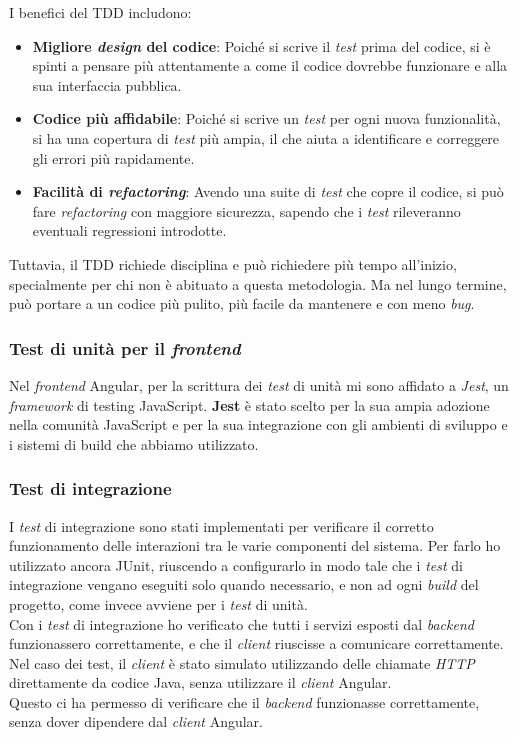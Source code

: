 I benefici del TDD includono:
\begin{itemize}
  \item \textbf{Migliore \textit{design} del codice}: Poiché si scrive il \textit{test} prima del codice, si è spinti a pensare più attentamente a come il codice dovrebbe funzionare e alla sua interfaccia pubblica.
  \item \textbf{Codice più affidabile}: Poiché si scrive un \textit{test} per ogni nuova funzionalità, si ha una copertura di \textit{test} più ampia, il che aiuta a identificare e correggere gli errori più rapidamente.
  \item \textbf{Facilità di \textit{refactoring}}: Avendo una suite di \textit{test} che copre il codice, si può fare \textit{refactoring} con maggiore sicurezza, sapendo che i \textit{test} rileveranno eventuali regressioni introdotte.
\end{itemize}

Tuttavia, il TDD richiede disciplina e può richiedere più tempo all'inizio, 
specialmente per chi non è abituato a questa metodologia. 
Ma nel lungo termine, può portare a un codice più pulito, più facile da mantenere e con meno \textit{bug}.

\subsubsection{Test di unità per il \textit{frontend}}
Nel \textit{frontend} Angular, per la scrittura dei \textit{test} di unità mi sono affidato a \textit{Jest}, 
un \textit{framework} di testing JavaScript.
\textbf{Jest} è stato scelto per la sua ampia adozione nella comunità JavaScript 
e per la sua integrazione con gli ambienti di sviluppo e i sistemi di build che abbiamo utilizzato. 

\subsubsection*{Test di integrazione}
I \textit{test} di integrazione sono stati implementati per verificare il corretto funzionamento 
delle interazioni tra le varie componenti del sistema.
Per farlo ho utilizzato ancora JUnit, riuscendo a configurarlo in modo tale che
i \textit{test} di integrazione vengano eseguiti solo quando necessario, 
e non ad ogni \textit{build} del progetto, come invece avviene per i \textit{test} di unità.\\

Con i \textit{test} di integrazione ho verificato che tutti i servizi esposti dal \textit{backend} funzionassero correttamente,
e che il \textit{client} riuscisse a comunicare correttamente.
Nel caso dei test, il \textit{client} è stato simulato utilizzando delle chiamate \textit{HTTP} 
direttamente da codice Java, senza utilizzare il \textit{client} Angular.\\
Questo ci ha permesso di verificare che il \textit{backend} funzionasse correttamente,
senza dover dipendere dal \textit{client} Angular.

